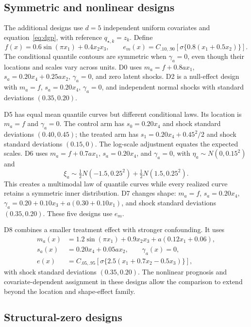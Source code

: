\documentclass[11pt]{article}
\begin{document}
\subsection{Symmetric and nonlinear designs}\label{sec:nonlinear-design}

The additional designs use $d=5$ independent uniform covariates and equation~\eqref{eq:dgp}, with reference $q_{\star,k}=z_k$. Define
\[
 f(x)=0.6\sin(\pi x_1)+0.4x_2x_3,\qquad
 e_m(x)=C_{.10,.90}[\sigma\{0.8(x_1+0.5x_2)\}].
\]
The conditional quantile contours are symmetric when $\gamma_a=0$, even though their locations and scales vary across units. D0 uses $m_a=f+0.8ax_1$, $s_a=0.20x_4+0.25ax_2$, $\gamma_a=0$, and zero latent shocks. D2 is a null-effect design with $m_a=f$, $s_a=0.20x_4$, $\gamma_a=0$, and independent normal shocks with standard deviations $(0.35,0.20)$.

D5 has equal mean quantile curves but different conditional laws. Its location is $m_a=f$ and $\gamma_a=0$. The control arm has $s_0=0.20x_4$ and shock standard deviations $(0.40,0.45)$; the treated arm has $s_1=0.20x_4+0.45^2/2$ and shock standard deviations $(0.15,0)$. The log-scale adjustment equates the expected scales. D6 uses $m_a=f+0.7ax_1$, $s_a=0.20x_4$, and $\gamma_a=0$, with $\eta_a\sim N(0,0.15^2)$ and
\[
 \xi_a\sim\tfrac12 N(-1.5,0.25^2)+\tfrac12 N(1.5,0.25^2).
\]
This creates a multimodal law of quantile curves while every realized curve retains a symmetric inner distribution. D7 changes shape: $m_a=f$, $s_a=0.20x_4$, $\gamma_a=0.20+0.10x_3+a(0.30+0.10x_1)$, and shock standard deviations $(0.35,0.20)$. These five designs use $e_m$.

D8 combines a smaller treatment effect with stronger confounding. It uses
\begin{align*}
 m_a(x)&=1.2\sin(\pi x_1)+0.9x_2x_3+a(0.12x_1+0.06),\\
 s_a(x)&=0.20x_4+0.05ax_2,\qquad \gamma_a(x)=0,\\
 e(x)&=C_{.05,.95}[\sigma\{2.5(x_1+0.7x_2-0.5x_3)\}],
\end{align*}
with shock standard deviations $(0.35,0.20)$. The nonlinear prognosis and covariate-dependent assignment in these designs allow the comparison to extend beyond the location and shape-effect family.

\subsection{Structural-zero designs}\label{sec:zi-design}
\end{document}
